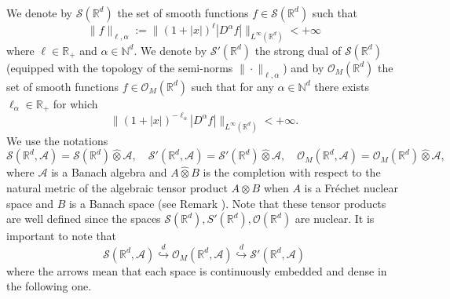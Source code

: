\documentclass{article}
\newcommand{\assign}{:=}
\begin{document}
\

We denote by $\mathcal{S} (\mathbb{R}^d)$ the set of smooth functions $f \in
\mathcal{S} (\mathbb{R}^d)$ such that
\[ \| f \|_{\ell, \alpha} \assign \| (1 + | x |)^{\ell} | D^{\alpha} f |
   \|_{L^{\infty} (\mathbb{R}^d)} < + \infty \]
where $\ell \in \mathbb{R}_+$ and $\alpha \in \mathbb{N}^d$. We denote by
$\mathcal{S}' (\mathbb{R}^d)$ the strong dual of $\mathcal{S} (\mathbb{R}^d)$
(equipped with the topology of the semi-norms $\| \cdot \|_{\ell, \alpha}$)
and by $\mathcal{O}_M (\mathbb{R}^d)$ the set of smooth functions $f \in
\mathcal{O}_M (\mathbb{R}^d)$ such that for any $\alpha \in \mathbb{N}^d$
there exists $\ell_{\alpha} \in \mathbb{R}_+$ for which
\[ \| (1 + | x |)^{- \ell_{\alpha}} | D^{\alpha} f | \|_{L^{\infty}
   (\mathbb{R}^d)} < + \infty . \]
We use the notations
\[ \mathcal{S} (\mathbb{R}^d, \mathcal{A}) = \mathcal{S} (\mathbb{R}^d)
   \hat{\otimes} \mathcal{A}, \quad \mathcal{S}' (\mathbb{R}^d, \mathcal{A}) =
   \mathcal{S}' (\mathbb{R}^d) \hat{\otimes} \mathcal{A}, \quad \mathcal{O}_M
   (\mathbb{R}^d, \mathcal{A}) = \mathcal{O}_M (\mathbb{R}^d) \hat{\otimes}
   \mathcal{A}, \]
where $\mathcal{A}$ is a Banach algebra and $A \hat{\otimes} B$ is the
completion with respect to the natural metric of the algebraic tensor product
$A \otimes B$ when $A$ is a Fr{\'e}chet nuclear space and $B$ is a Banach
space (see Remark ). Note that these tensor products are well defined since
the spaces $\mathcal{S} (\mathbb{R}^d), S' (\mathbb{R}^d), \mathcal{O}
(\mathbb{R}^d)$ are nuclear. It is important to note that
\[ \mathcal{S} (\mathbb{R}^d, \mathcal{A}) \overset{d}{\hookrightarrow}
   \mathcal{O}_M (\mathbb{R}^d, \mathcal{A}) \overset{d}{\hookrightarrow}
   \mathcal{S}' (\mathbb{R}^d, \mathcal{A}) \]
where the arrows mean that each space is continuously embedded and dense in
the following one.
\end{document}
